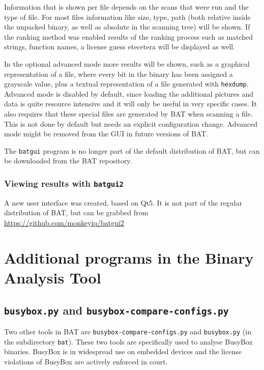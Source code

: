 \documentclass[10pt,a4paper]{article}
\begin{document}
Information that is shown per file depends on the scans that were run and the
type of file. For most files information like size, type, path (both relative
inside the unpacked binary, as well as absolute in the scanning tree) will be
shown. If the ranking method was enabled results of the ranking process such as
matched strings, function names, a license guess etecetera will be displayed as
well.

In the optional advanced mode more results will be shown, such as a graphical
representation of a file, where every bit in the binary has been assigned a
grayscale value, plus a textual representation of a file generated with
\texttt{hexdump}. Advanced mode is disabled by default, since loading the
additional pictures and data is quite resource intensive and it will only be
useful in very specific cases. It also requires that these special files are
generated by BAT when scanning a file. This is not done by default but needs
an explicit configuration change. Advanced mode might be removed from the GUI
in future versions of BAT.

The \texttt{batgui} program is no longer part of the default distribution of
BAT, but can be downloaded from the BAT repository.

\subsubsection{Viewing results with \texttt{batgui2}}

A new user interface was created, based on Qt5. It is not part of the regular
distribution of BAT, but can be grabbed from
\url{https://github.com/monkeyiq/batgui2}

\section{Additional programs in the Binary Analysis Tool}

\subsection{\texttt{busybox.py} and \texttt{busybox-compare-configs.py}}

Two other tools in BAT are \texttt{busybox-compare-configs.py} and
\texttt{busybox.py} (in the subdirectory \texttt{bat}). These two tools are
specifically used to analyse BusyBox binaries. BusyBox is in widespread use on
embedded devices and the license violations of BusyBox are actively enforced
in court.
\end{document}
